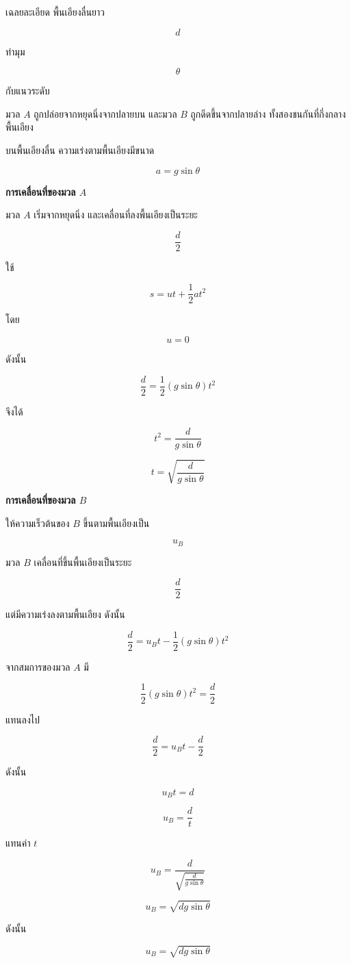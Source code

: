 \vspace{1em}

\begin{examplebox}{เฉลยละเอียด}
พื้นเอียงลื่นยาว

\[
d
\]

ทำมุม

\[
\theta
\]

กับแนวระดับ

มวล $A$ ถูกปล่อยจากหยุดนิ่งจากปลายบน และมวล $B$ ถูกดีดขึ้นจากปลายล่าง ทั้งสองชนกันที่กึ่งกลางพื้นเอียง

บนพื้นเอียงลื่น ความเร่งตามพื้นเอียงมีขนาด

\[
a=g\sin\theta
\]

\textbf{การเคลื่อนที่ของมวล $A$}

มวล $A$ เริ่มจากหยุดนิ่ง และเคลื่อนที่ลงพื้นเอียงเป็นระยะ

\[
\frac{d}{2}
\]

ใช้

\[
s=ut+\frac{1}{2}at^2
\]

โดย

\[
u=0
\]

ดังนั้น

\[
\frac{d}{2}=\frac{1}{2}(g\sin\theta)t^2
\]

จึงได้

\[
t^2=\frac{d}{g\sin\theta}
\]

\[
t=\sqrt{\frac{d}{g\sin\theta}}
\]

\textbf{การเคลื่อนที่ของมวล $B$}

ให้ความเร็วต้นของ $B$ ขึ้นตามพื้นเอียงเป็น

\[
u_B
\]

มวล $B$ เคลื่อนที่ขึ้นพื้นเอียงเป็นระยะ

\[
\frac{d}{2}
\]

แต่มีความเร่งลงตามพื้นเอียง ดังนั้น

\[
\frac{d}{2}=u_Bt-\frac{1}{2}(g\sin\theta)t^2
\]

จากสมการของมวล $A$ มี

\[
\frac{1}{2}(g\sin\theta)t^2=\frac{d}{2}
\]

แทนลงไป

\[
\frac{d}{2}=u_Bt-\frac{d}{2}
\]

ดังนั้น

\[
u_Bt=d
\]

\[
u_B=\frac{d}{t}
\]

แทนค่า $t$

\[
u_B=
\frac{d}{\sqrt{\frac{d}{g\sin\theta}}}
\]

\[
u_B=\sqrt{dg\sin\theta}
\]

ดังนั้น

\[
\boxed{u_B=\sqrt{dg\sin\theta}}
\]
\end{examplebox}

